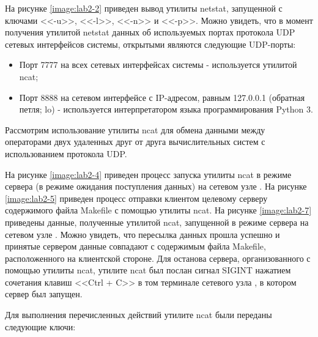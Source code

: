 	На рисунке \ref{image:lab2-2} приведен вывод утилиты netstat, запущенной с ключами <<-u>>, <<-l>>, <<-n>> и <<-p>>.
	Можно увидеть, что в момент получения утилитой netstat данных об используемых портах протокола UDP сетевых интерфейсов системы, открытыми являются
	следующие UDP-порты:

	\begin{itemize}

		\item Порт 7777 на всех сетевых интерфейсах системы - используется утилитой ncat;

		\item Порт 8888 на сетевом интерфейсе с IP-адресом, равным 127.0.0.1 (обратная петля; lo) - используется интерпретатором языка программирования
		Python 3.

	\end{itemize}


	Рассмотрим использование утилиты ncat для обмена данными между операторами двух удаленных друг от друга вычислительных систем с использованием протокола UDP.

	На рисунке \ref{image:lab2-4} приведен процесс запуска утилиты ncat в режиме сервера (в режиме ожидания поступления данных) на сетевом узле \myip.
	На рисунке \ref{image:lab2-5} приведен процесс отправки клиентом целевому серверу содержимого файла Makefile с помощью утилиты ncat.
	На рисунке \ref{image:lab2-7} приведены данные, полученные утилитой ncat, запущенной в режиме сервера на сетевом узле \myip.
	Можно увидеть, что пересылка данных прошла успешно и принятые сервером данные совпадают с содержимым файла Makefile, расположенного на клиентской стороне.
	Для останова сервера, организованного с помощью утилиты ncat, утилите ncat был послан сигнал SIGINT нажатием сочетания клавиш <<Ctrl + C>> в том терминале
	сетевого узла \myip, в котором сервер был запущен.

	Для выполнения перечисленных действий утилите ncat были переданы следующие ключи:

